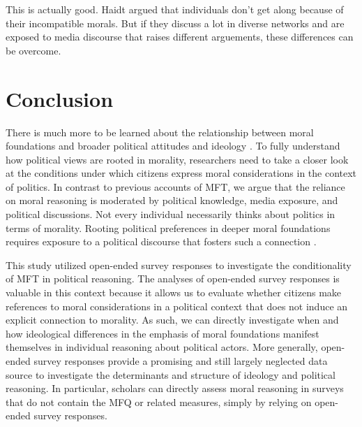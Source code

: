 \documentclass[12pt]{article}
\begin{document}
This is actually good. Haidt argued that individuals don't get along because of their incompatible morals. But if they discuss a lot in diverse networks and are exposed to media discourse that raises different arguements, these differences can be overcome.


\section*{Conclusion}

There is much more to be learned about the relationship between moral foundations and broader political attitudes and ideology \citep[e.g.,][]{feldman2013political}. To fully understand how political views are rooted in morality, researchers need to take a closer look at the conditions under which citizens express moral considerations in the context of politics. In contrast to previous accounts of MFT, we argue that the reliance on moral reasoning is moderated by political knowledge, media exposure, and political discussions. Not every individual necessarily thinks about politics in terms of morality. Rooting political preferences in deeper moral foundations requires exposure to a political discourse that fosters such a connection \citep[c.f.,][]{clifford2015concerns}.

This study utilized open-ended survey responses to investigate the conditionality of MFT in political reasoning. The analyses of open-ended survey responses is valuable in this context because it allows us to evaluate whether citizens make references to moral considerations in a political context that does not induce an explicit connection to morality. As such, we can directly investigate when and how ideological differences in the emphasis of moral foundations manifest themselves in individual reasoning about political actors. More generally, open-ended survey responses provide a promising and still largely neglected data source to investigate the determinants and structure of ideology and political reasoning. In particular, scholars can directly assess moral reasoning in surveys that do not contain the MFQ or related measures, simply by relying on open-ended survey responses.
\end{document}
